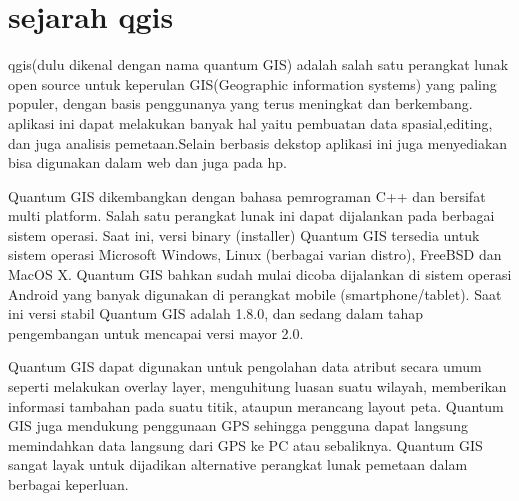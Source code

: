 
\section{sejarah qgis}
  qgis(dulu dikenal dengan nama quantum GIS) adalah salah satu perangkat lunak open source untuk keperulan GIS(Geographic information systems) yang paling populer, dengan basis penggunanya yang terus meningkat dan berkembang.
  aplikasi ini dapat melakukan banyak hal yaitu pembuatan data spasial,editing, dan juga analisis pemetaan.Selain berbasis dekstop aplikasi ini juga menyediakan bisa digunakan dalam web dan juga pada hp.

Quantum GIS dikembangkan dengan bahasa pemrograman C++ dan bersifat multi platform. Salah satu perangkat lunak ini dapat dijalankan pada berbagai sistem operasi. Saat ini, versi binary (installer) Quantum GIS tersedia untuk sistem operasi Microsoft Windows, Linux (berbagai varian distro), FreeBSD dan MacOS X. Quantum GIS bahkan sudah mulai dicoba dijalankan di sistem operasi Android yang banyak digunakan di perangkat mobile (smartphone/tablet). Saat ini versi stabil Quantum GIS adalah 1.8.0, dan sedang dalam tahap pengembangan untuk mencapai versi mayor 2.0.

Quantum GIS dapat digunakan untuk pengolahan data atribut secara umum seperti melakukan overlay layer, menguhitung luasan suatu wilayah, memberikan informasi tambahan pada suatu titik, ataupun merancang layout peta. Quantum GIS juga mendukung penggunaan GPS sehingga pengguna dapat langsung memindahkan data langsung dari GPS ke PC atau sebaliknya. Quantum GIS sangat layak untuk dijadikan alternative perangkat lunak pemetaan dalam berbagai keperluan.

